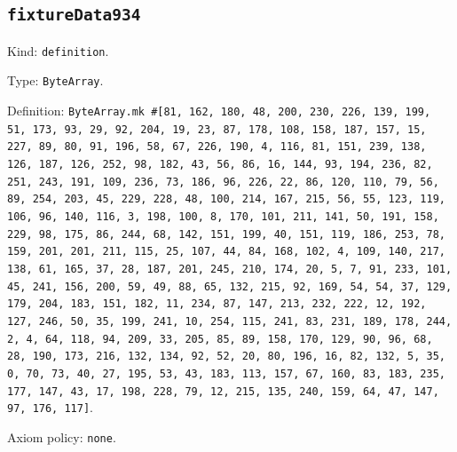 \documentclass[11pt]{article}
\begin{document}
\subsection*{\texttt{fixtureData934}}
\noindent Kind: \texttt{definition}.\par
\noindent Type: \texttt{ByteArray}.\par
\noindent Definition: \texttt{ByteArray.mk \#[81, 162, 180, 48, 200, 230, 226, 139, 199, 51, 173, 93, 29, 92, 204, 19, 23, 87, 178, 108, 158, 187, 157, 15, 227, 89, 80, 91, 196, 58, 67, 226, 190, 4, 116, 81, 151, 239, 138, 126, 187, 126, 252, 98, 182, 43, 56, 86, 16, 144, 93, 194, 236, 82, 251, 243, 191, 109, 236, 73, 186, 96, 226, 22, 86, 120, 110, 79, 56, 89, 254, 203, 45, 229, 228, 48, 100, 214, 167, 215, 56, 55, 123, 119, 106, 96, 140, 116, 3, 198, 100, 8, 170, 101, 211, 141, 50, 191, 158, 229, 98, 175, 86, 244, 68, 142, 151, 199, 40, 151, 119, 186, 253, 78, 159, 201, 201, 211, 115, 25, 107, 44, 84, 168, 102, 4, 109, 140, 217, 138, 61, 165, 37, 28, 187, 201, 245, 210, 174, 20, 5, 7, 91, 233, 101, 45, 241, 156, 200, 59, 49, 88, 65, 132, 215, 92, 169, 54, 54, 37, 129, 179, 204, 183, 151, 182, 11, 234, 87, 147, 213, 232, 222, 12, 192, 127, 246, 50, 35, 199, 241, 10, 254, 115, 241, 83, 231, 189, 178, 244, 2, 4, 64, 118, 94, 209, 33, 205, 85, 89, 158, 170, 129, 90, 96, 68, 28, 190, 173, 216, 132, 134, 92, 52, 20, 80, 196, 16, 82, 132, 5, 35, 0, 70, 73, 40, 27, 195, 53, 43, 183, 113, 157, 67, 160, 83, 183, 235, 177, 147, 43, 17, 198, 228, 79, 12, 215, 135, 240, 159, 64, 47, 147, 97, 176, 117]}.\par
\noindent Axiom policy: \texttt{none}.\par
\end{document}
